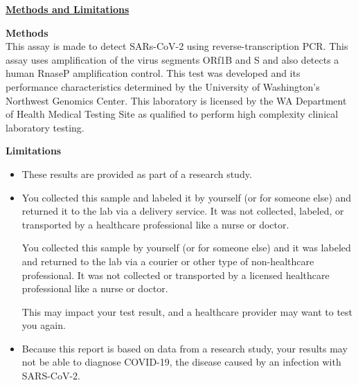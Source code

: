 \documentclass[10pt]{article}
\begin{document}
\bigskip

\large \underline{\textbf{Methods and Limitations}}

\textbf{Methods}\\
This assay is made to detect SARs-CoV-2 using reverse-transcription PCR. This
assay uses amplification of the virus segments ORf1B and S and also detects a
human RnaseP amplification control. This test was developed and its performance
characteristics determined by the University of Washington’s Northwest Genomics
Center. This laboratory is licensed by the WA Department of Health Medical
Testing Site as qualified to perform high complexity clinical laboratory
testing.

\textbf{Limitations}

\begin{itemize}

\item

  These results are provided as part of a research study.

\item
  You collected this sample and labeled it by yourself (or for someone else) and
  returned it to the lab via a delivery service. It was not collected, labeled,
  or transported by a healthcare professional like a nurse or doctor.

  You collected this sample by yourself (or for someone else) and it was labeled
  and returned to the lab via a courier or other type of non-healthcare
  professional. It was not collected or transported by a licensed healthcare
  professional like a nurse or doctor.



  This may impact your test result, and a healthcare provider may want to test
  you again.

\item

  Because this report is based on data from a research study, your results may
  not be able to diagnose COVID-19, the disease caused by an infection with
  SARS-CoV-2.

\end{itemize}
\end{document}
